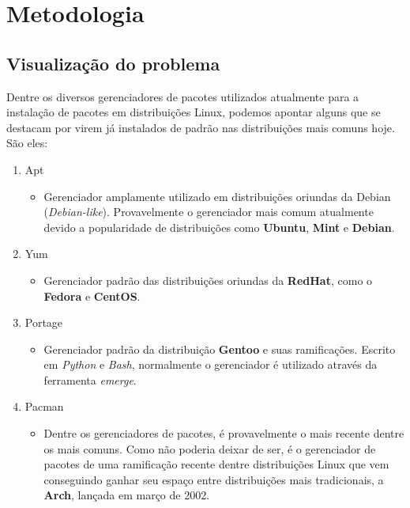 \chapter{Metodologia} %
\label{sec:metodologia}


\section{Visualização do problema} %
\label{sub:visualiza_o_do_problema}

Dentre os diversos gerenciadores de pacotes utilizados atualmente para a instalação de pacotes em distribuições Linux, podemos apontar alguns que se destacam por virem já instalados de padrão nas distribuições mais comuns hoje. São eles:

\begin{enumerate}
	\item Apt
	\begin{itemize}
		\item Gerenciador amplamente utilizado em distribuições oriundas da Debian (\textit{Debian-like}). Provavelmente o gerenciador mais comum atualmente devido a popularidade de distribuições como \textbf{Ubuntu}, \textbf{Mint} e \textbf{Debian}.
	\end{itemize}
	\item Yum
	\begin{itemize}
		\item Gerenciador padrão  das distribuições oriundas da \textbf{RedHat}, como o \textbf{Fedora} e \textbf{CentOS}.
	\end{itemize}
	\item Portage
	\begin{itemize}
		\item Gerenciador padrão da distribuição \textbf{Gentoo} e suas ramificações. Escrito em \textit{Python} e \textit{Bash}, normalmente o gerenciador é utilizado através da ferramenta \textit{emerge}.
	\end{itemize}
	\item Pacman
	\begin{itemize}
		\item Dentre os gerenciadores de pacotes, é provavelmente o mais recente dentre os mais comuns. Como não poderia deixar de ser, é  o gerenciador de pacotes de uma ramificação recente dentre distribuições Linux que vem conseguindo ganhar seu espaço entre distribuições mais tradicionais, a \textbf{Arch}, lançada em março de 2002.
	\end{itemize}
\end{enumerate}

